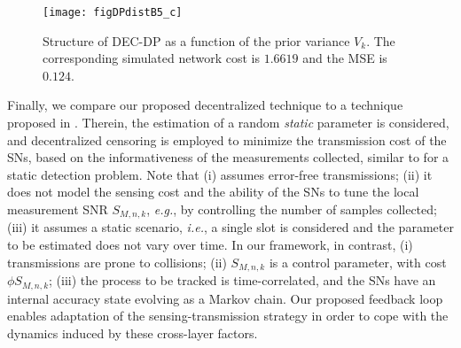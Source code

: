 \documentclass[10pt,twocolumn,twoside]{IEEEtran}
\theoremstyle{plain}
\begin{document}
\begin{figure}[t]
\centering
\texttt{[image: figDPdistB5\_c]}
\vspace{-3mm}
\caption{Structure of DEC-DP as a function of the prior variance $V_k$.
The corresponding simulated network cost is $1.6619$ and the MSE is $0.124$.}\label{DISTDPSTRUC_B5}
\vspace{-5mm}
\end{figure}

 
 Finally, we compare our proposed decentralized  technique to a technique proposed in \cite{Msechu}.
Therein, the estimation of a random \emph{static} parameter is considered, and decentralized censoring is employed to minimize the transmission cost of the SNs,
based on the informativeness of the measurements collected, similar to \cite{Appadwedula} for a static detection problem.
Note that (i) \cite{Msechu} assumes error-free transmissions; (ii)
it does not model the sensing cost and the ability of the SNs to tune the local measurement SNR $S_{M,n,k}$, \emph{e.g.},
by controlling the number of samples collected;
(iii) it assumes a static scenario, \emph{i.e.}, a single slot is considered and the parameter to be estimated does not vary over time.
In our framework, in contrast, (i) transmissions are prone to collisions; (ii) $S_{M,n,k}$ is a control parameter, with cost $\phi S_{M,n,k}$;
(iii) the process to be tracked is time-correlated,  and the SNs have an internal accuracy state evolving as a Markov chain.
Our proposed feedback loop enables adaptation of the sensing-transmission strategy in order to cope with the dynamics induced by these
cross-layer factors.
\end{document}
